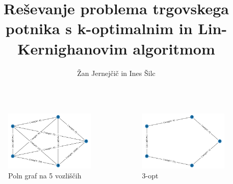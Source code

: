 \documentclass[10pt]{beamer}
\begin{document}
\title[Reševanje problema trgovskega potnika s k-optimalnim in
Lin-Kernighanovim algoritmom]{Reševanje problema trgovskega potnika s k-optimalnim in
Lin-Kernighanovim algoritmom}
\author[Žan Jernejčič in Ines Šilc]{Žan Jernejčič in Ines Šilc}

\begin{frame}
	\titlepage
\end {frame}

\begin{frame}

\begin{columns}

\begin{minipage}[c][0.4\textheight][c]{\linewidth}
  \begin{figure}
  \includegraphics[width=0.8\linewidth]{primeri/primer1.png}
 	\caption{Poln graf na 5 vozliščih}
	\label{Slika 1}
	\end{figure}
\end{minipage}

\begin{minipage}[c][0.4\textheight][c]{\linewidth}
  \begin{figure}
  \includegraphics[width=0.8\linewidth]{primeri/primer1_3opt.png}
 	\caption{3-opt}
	\label{Slika 3}
	\end{figure}
\end{minipage}


\end{columns}
\end{frame}
\end{document}
